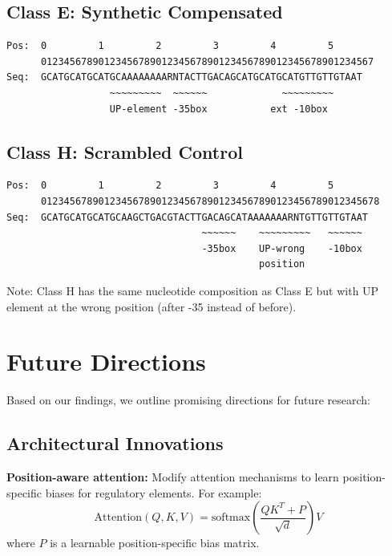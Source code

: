 \documentclass{article}
\begin{document}
\subsection{Class E: Synthetic Compensated}
{\small
\begin{verbatim}
Pos:  0         1         2         3         4         5
      0123456789012345678901234567890123456789012345678901234567
Seq:  GCATGCATGCATGCAAAAAAAARNTACTTGACAGCATGCATGCATGTTGTTGTAAT
                  ~~~~~~~~~  ~~~~~~             ~~~~~~~~~
                  UP-element -35box           ext -10box
\end{verbatim}
}

\subsection{Class H: Scrambled Control}
{\small
\begin{verbatim}
Pos:  0         1         2         3         4         5
      01234567890123456789012345678901234567890123456789012345678
Seq:  GCATGCATGCATGCAAGCTGACGTACTTGACAGCATAAAAAAARNTGTTGTTGTAAT
                                  ~~~~~~    ~~~~~~~~~   ~~~~~~
                                  -35box    UP-wrong    -10box
                                            position
\end{verbatim}
}

Note: Class H has the same nucleotide composition as Class E but with UP element at the wrong position (after -35 instead of before).

\section{Future Directions}
\label{app:future}

Based on our findings, we outline promising directions for future research:

\subsection{Architectural Innovations}

\textbf{Position-aware attention:} Modify attention mechanisms to learn position-specific biases for regulatory elements. For example:
\begin{equation}
\text{Attention}(Q, K, V) = \text{softmax}\left(\frac{QK^T + P}{\sqrt{d}}\right)V
\end{equation}
where $P$ is a learnable position-specific bias matrix.
\end{document}
